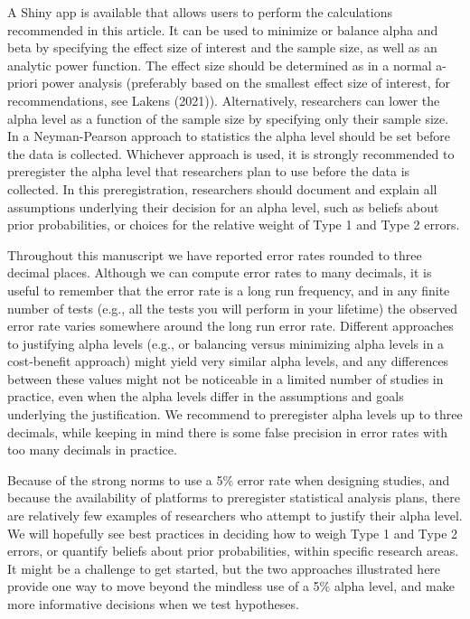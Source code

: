 \documentclass[
  english,
  ,jou, a4paper,floatsintext]{apa6}
\begin{document}
A Shiny app is available that allows users to perform the calculations recommended in this article. It can be used to minimize or balance alpha and beta by specifying the effect size of interest and the sample size, as well as an analytic power function. The effect size should be determined as in a normal a-priori power analysis (preferably based on the smallest effect size of interest, for recommendations, see Lakens (2021)). Alternatively, researchers can lower the alpha level as a function of the sample size by specifying only their sample size. In a Neyman-Pearson approach to statistics the alpha level should be set before the data is collected. Whichever approach is used, it is strongly recommended to preregister the alpha level that researchers plan to use before the data is collected. In this preregistration, researchers should document and explain all assumptions underlying their decision for an alpha level, such as beliefs about prior probabilities, or choices for the relative weight of Type 1 and Type 2 errors.

Throughout this manuscript we have reported error rates rounded to three decimal places. Although we can compute error rates to many decimals, it is useful to remember that the error rate is a long run frequency, and in any finite number of tests (e.g., all the tests you will perform in your lifetime) the observed error rate varies somewhere around the long run error rate. Different approaches to justifying alpha levels (e.g., or balancing versus minimizing alpha levels in a cost-benefit approach) might yield very similar alpha levels, and any differences between these values might not be noticeable in a limited number of studies in practice, even when the alpha levels differ in the assumptions and goals underlying the justification. We recommend to preregister alpha levels up to three decimals, while keeping in mind there is some false precision in error rates with too many decimals in practice.

Because of the strong norms to use a 5\% error rate when designing studies, and because the availability of platforms to preregister statistical analysis plans, there are relatively few examples of researchers who attempt to justify their alpha level. We will hopefully see best practices in deciding how to weigh Type 1 and Type 2 errors, or quantify beliefs about prior probabilities, within specific research areas. It might be a challenge to get started, but the two approaches illustrated here provide one way to move beyond the mindless use of a 5\% alpha level, and make more informative decisions when we test hypotheses.
\end{document}
